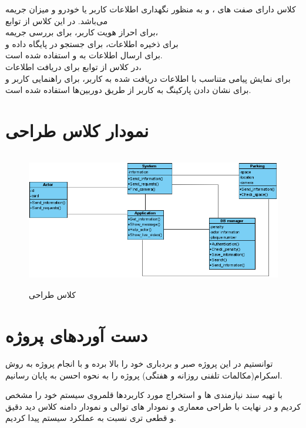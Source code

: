 \documentclass[oneside,a4paper,12pt]{book}
\begin{document}
کلاس  دارای صفت های ، و  به منظور نگهداری اطلاعات کاربر یا خودرو و میزان جریمه می‌باشد. در این کلاس از توابع\\  برای احراز هویت کاربر،  برای بررسی جریمه،\\  برای ذخیره اطلاعات،  برای جستجو در پایگاه داده و\\  برای ارسال اطلاعات به  و استفاده شده است.\\

در کلاس   از توابع  برای دریافت اطلاعات،\\  برای نمایش پیامی متناسب با اطلاعات دریافت شده به کاربر، برای راهنمایی کاربر و برای نشان دادن پارکینگ به کاربر از طریق دوربین‌ها استفاده شده است.\\

\vspace{-1cm}
\section{نمودار کلاس طراحی}
\begin{figure}[h]
	\begin{center}
		\includegraphics[height=6cm, width=14cm]{ClassDiagram.png}
		\caption{کلاس طراحی}
	\end{center}
\end{figure}
\section{دست آوردهای پروژه}
توانستیم در این پروژه صبر و بردباری خود را بالا برده و با انجام پروژه به روش اسکرام(مکالمات تلفنی روزانه و هفتگی) پروژه را به نحوه احسن به پایان رسانیم.

با تهیه سند نیازمندی ها و استخراج مورد کاربردها قلمروی سیستم خود را مشخص کردیم و در نهایت با طراحی
معماری و نمودار های توالی و نمودار دامنه کلاس دید دقیق و قطعی تری نسبت به عملکرد سیستم پیدا کردیم.
\end{document}
